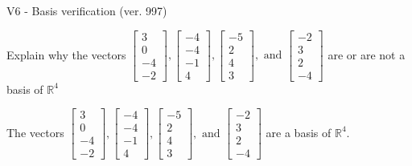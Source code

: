 \begin{exercise}
  \begin{exerciseTitle}V6 - Basis verification (ver. 997)\end{exerciseTitle}
  \begin{exerciseStatement}
    Explain why the vectors \(\left[\begin{array}{r}
3 \\
0 \\
-4 \\
-2
\end{array}\right] , \left[\begin{array}{r}
-4 \\
-4 \\
-1 \\
4
\end{array}\right] , \left[\begin{array}{r}
-5 \\
2 \\
4 \\
3
\end{array}\right] , \text{ and } \left[\begin{array}{r}
-2 \\
3 \\
2 \\
-4
\end{array}\right]\) are or are not a basis of \(\mathbb{R}^4\)	


  \end{exerciseStatement}
  \begin{exerciseAnswer}
   The vectors \(\left[\begin{array}{r}
3 \\
0 \\
-4 \\
-2
\end{array}\right] , \left[\begin{array}{r}
-4 \\
-4 \\
-1 \\
4
\end{array}\right] , \left[\begin{array}{r}
-5 \\
2 \\
4 \\
3
\end{array}\right] , \text{ and } \left[\begin{array}{r}
-2 \\
3 \\
2 \\
-4
\end{array}\right]\) 
  	 are  a basis of \(\mathbb{R}^4\).
  


  \end{exerciseAnswer}
\end{exercise}
